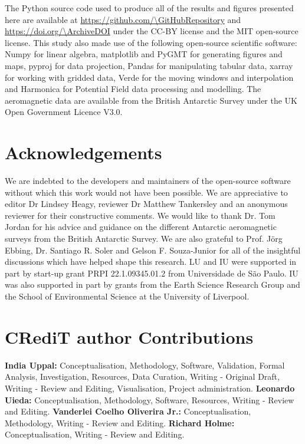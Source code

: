 The Python source code used to produce all of the results and figures presented here are available at \url{https://github.com/\GitHubRepository} and
\url{https://doi.org/\ArchiveDOI} under the CC-BY license and the MIT open-source license. This study also made use of the following open-source scientific software: Numpy \citep{numpy} for linear algebra, matplotlib \citep{matplotlib} and PyGMT \citep{pygmt} for generating figures and maps, pyproj \citep{pyproj} for data projection, Pandas \citep{pandas} for manipulating tabular data, xarray \citep{xarray} for working with gridded data, Verde \citep{verde} for the moving windows and interpolation and Harmonica \citep{harmonica} for Potential Field data processing and modelling. The aeromagnetic data are available from the British Antarctic Survey \citep{ICEGRAV_data} under the UK Open Government Licence V3.0.

\section{Acknowledgements}

We are indebted to the developers and maintainers of the open-source software without which this work would not have been possible. We are
appreciative to editor Dr Lindsey Heagy, reviewer Dr Matthew Tankersley and an anonymous reviewer for their constructive comments. We would like to thank Dr. Tom Jordan for his advice and guidance on the different Antarctic aeromagnetic surveys from the British Antarctic Survey. We are also grateful to Prof. J\"{o}rg Ebbing, Dr. Santiago R. Soler and Gelson F. Souza-Junior for all of the insightful discussions which have helped shape this research. LU and IU were supported in part by start-up grant PRPI 22.1.09345.01.2 from Universidade de São Paulo. IU was also supported in part by grants from the Earth Science Research Group and the School of Environmental Science at the University of Liverpool.

\section{CRediT author Contributions}

\textbf{India Uppal:} Conceptualisation, Methodology, Software, Validation, Formal Analysis, Investigation, Resources, Data Curation, Writing - Original Draft, Writing - Review and Editing, Visualisation, Project administration.
\textbf{Leonardo Uieda:} Conceptualisation, Methodology, Software, Resources, Writing - Review and Editing.
\textbf{Vanderlei Coelho Oliverira Jr.:} Conceptualisation, Methodology, Writing - Review and Editing.
\textbf{Richard Holme:} Conceptualisation, Writing - Review and Editing.
